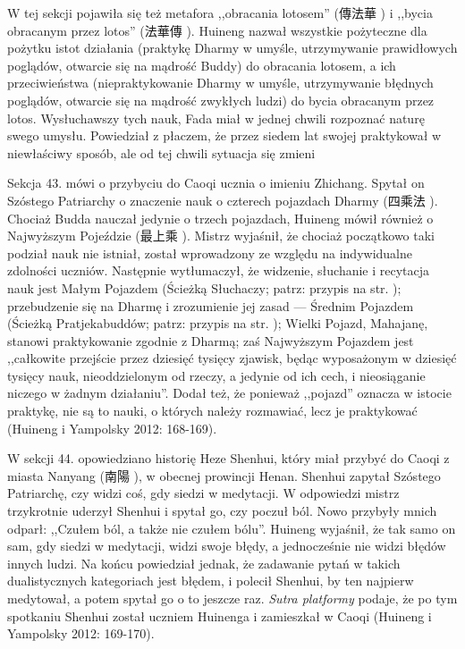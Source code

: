 W tej sekcji pojawiła się też metafora ,,obracania lotosem'' (傳法華 ) i ,,bycia obracanym przez lotos'' (法華傳 ).
Huineng nazwał wszystkie pożyteczne dla pożytku istot działania (praktykę Dharmy w umyśle, utrzymywanie prawidłowych poglądów, otwarcie się na mądrość Buddy) do obracania lotosem, a ich przeciwieństwa (niepraktykowanie Dharmy w umyśle, utrzymywanie błędnych poglądów, otwarcie się na mądrość zwykłych ludzi) do bycia obracanym przez lotos.
Wysłuchawszy tych nauk, Fada miał w jednej chwili rozpoznać naturę swego umysłu.
Powiedział z płaczem, że przez siedem lat swojej praktykował w niewłaściwy sposób, ale od tej chwili sytuacja się zmieni\ibid

Sekcja 43. mówi o przybyciu do Caoqi ucznia o imieniu Zhichang.
Spytał on Szóstego Patriarchy o znaczenie nauk o czterech pojazdach Dharmy (四乘法 ).\label{SiChengFa}
Chociaż Budda nauczał jedynie o trzech pojazdach, Huineng mówił również o Najwyższym Pojeździe (最上乘 ).
Mistrz wyjaśnił, że chociaż początkowo taki podział nauk nie istniał, został wprowadzony ze względu na indywidualne zdolności uczniów.
Następnie wytłumaczył, że widzenie, słuchanie i recytacja nauk jest Małym Pojazdem (Ścieżką Słuchaczy; patrz: przypis na str. \pageref{Triyana});
przebudzenie się na Dharmę i zrozumienie jej zasad --- Średnim Pojazdem (Ścieżką Pratjekabuddów; patrz: przypis na str. \pageref{Triyana});
Wielki Pojazd, Mahajanę, stanowi praktykowanie zgodnie z Dharmą; zaś Najwyższym Pojazdem jest ,,całkowite przejście przez dziesięć tysięcy zjawisk, będąc wyposażonym w dziesięć tysięcy nauk, nieoddzielonym od rzeczy, a jedynie od ich cech, i nieosiąganie niczego w żadnym działaniu''.
Dodał też, że ponieważ ,,pojazd'' oznacza w istocie praktykę, nie są to nauki, o których należy rozmawiać, lecz je praktykować
(Huineng i Yampolsky 2012: 168-169).

W sekcji 44. opowiedziano historię Heze Shenhui, który miał przybyć do Caoqi z miasta Nanyang (南陽 ), w obecnej prowincji Henan.
Shenhui zapytał Szóstego Patriarchę, czy widzi coś, gdy siedzi w medytacji.
W odpowiedzi mistrz trzykrotnie uderzył Shenhui i spytał go, czy poczuł ból.
Nowo przybyły mnich odparł: ,,Czułem ból, a także nie czułem bólu''.
Huineng wyjaśnił, że tak samo on sam, gdy siedzi w medytacji, widzi swoje błędy, a jednocześnie nie widzi błędów innych ludzi.
Na końcu powiedział jednak, że zadawanie pytań w takich dualistycznych kategoriach jest błędem, i polecił Shenhui, by ten najpierw medytował, a potem spytał go o to jeszcze raz.
\textit{Sutra platformy} podaje, że po tym spotkaniu Shenhui został uczniem Huinenga i zamieszkał w Caoqi
(Huineng i Yampolsky 2012: 169-170).


